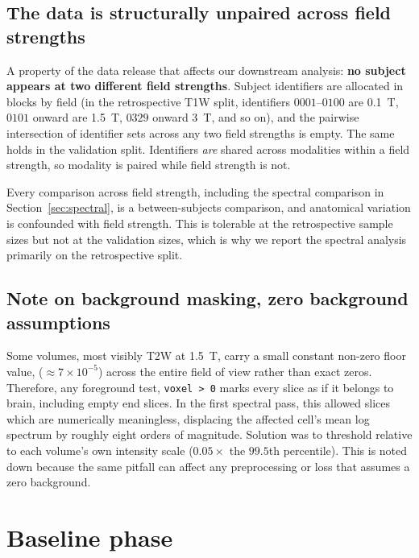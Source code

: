 \documentclass[11pt,a4paper]{article}
\begin{document}
\subsection{The data is structurally unpaired across field strengths}
\label{sec:unpaired}

A property of the data release that affects our downstream analysis: \textbf{no subject appears at two
different field strengths}. Subject identifiers are allocated in blocks by field (in the
retrospective T1W split, identifiers $0001$--$0100$ are \SI{0.1}{\tesla}, $0101$ onward are
\SI{1.5}{\tesla}, $0329$ onward \SI{3}{\tesla}, and so on), and the pairwise intersection of
identifier sets across any two field strengths is empty. The same holds in the validation split.
Identifiers \emph{are} shared across modalities within a field strength, so modality is paired while
field strength is not.

Every comparison across
field strength, including the spectral comparison in Section~\ref{sec:spectral}, is a
between-subjects comparison, and anatomical variation is confounded with field strength. This is
tolerable at the retrospective sample sizes but not at the validation sizes, which is why we report the
spectral analysis primarily on the retrospective split.

\subsection{Note on background masking, zero background assumptions}
\label{sec:background}

Some volumes, most visibly T2W at \SI{1.5}{\tesla}, carry a small constant non-zero floor value,
($\approx 7\times10^{-5}$) across the entire field of view rather than exact zeros. Therefore, any foreground test,
\verb|voxel > 0| marks every slice as if it belongs to brain, including empty end slices. In the
first spectral pass, this allowed slices which are numerically meaningless, 
displacing the affected cell's mean log spectrum by roughly eight orders of
magnitude. Solution was to threshold relative to each volume's own intensity scale
($0.05 \times$ the $99.5$th percentile). This is noted down because the same pitfall can affect
any preprocessing or loss that assumes a zero background.

\section{Baseline phase}
\label{sec:baselines}
\end{document}

